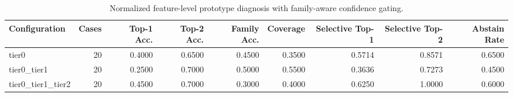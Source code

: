 \begin{table}[t]
\centering
\caption{Normalized feature-level prototype diagnosis with family-aware confidence gating.}
\label{tab:dice_stressor_hierarchical_diagnosis}
\footnotesize
\begin{tabular}{lrrrrrrrr}
\toprule
Configuration & Cases & Top-1 Acc. & Top-2 Acc. & Family Acc. & Coverage & Selective Top-1 & Selective Top-2 & Abstain Rate \\
\midrule
tier0 & 20 & 0.4000 & 0.6500 & 0.4500 & 0.3500 & 0.5714 & 0.8571 & 0.6500 \\
tier0_tier1 & 20 & 0.2500 & 0.7000 & 0.5000 & 0.5500 & 0.3636 & 0.7273 & 0.4500 \\
tier0_tier1_tier2 & 20 & 0.4500 & 0.7000 & 0.3000 & 0.4000 & 0.6250 & 1.0000 & 0.6000 \\
\bottomrule
\end{tabular}

\end{table}

